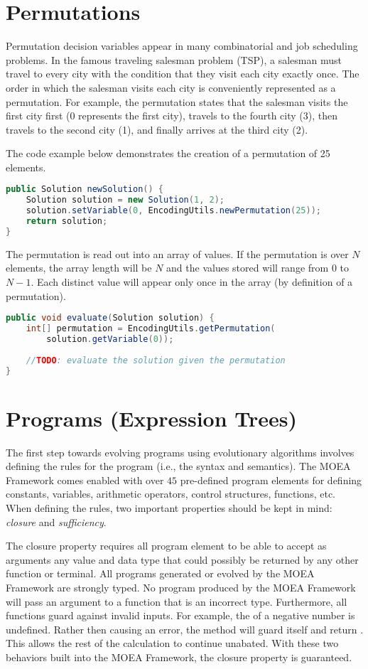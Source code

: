 \section{Permutations}
Permutation decision variables appear in many combinatorial and job scheduling problems.  In the famous traveling salesman problem (TSP), a salesman must travel to every city with the condition that they visit each city exactly once.  The order in which the salesman visits each city is conveniently represented as a permutation.  For example, the permutation  states that the salesman visits the first city first (0 represents the first city), travels to the fourth city (3), then travels to the second city (1), and finally arrives at the third city (2).

The code example below demonstrates the creation of a permutation of 25 elements.
\begin{lstlisting}[language=Java]
public Solution newSolution() {
    Solution solution = new Solution(1, 2);
    solution.setVariable(0, EncodingUtils.newPermutation(25));
    return solution;
}
\end{lstlisting}

The permutation is read out into an array of  values.  If the permutation is over $N$ elements, the array length will be $N$ and the values stored will range from $0$ to $N-1$.  Each distinct value will appear only once in the array (by definition of a permutation).
\begin{lstlisting}[language=Java]
public void evaluate(Solution solution) {
    int[] permutation = EncodingUtils.getPermutation(
        solution.getVariable(0));
        
    //TODO: evaluate the solution given the permutation
}
\end{lstlisting}

\section{Programs (Expression Trees)}
The first step towards evolving programs using evolutionary algorithms involves defining the rules for the program (i.e., the syntax and semantics).  The MOEA Framework comes enabled with over $45$ pre-defined program elements for defining constants, variables, arithmetic operators, control structures, functions, etc.  When defining the rules, two important properties should be kept in mind: \emph{closure} and \emph{sufficiency}.

The closure property requires all program element to be able to accept as arguments any value and data type that could possibly be returned by any other function or terminal.  All programs generated or evolved by the MOEA Framework are strongly typed.  No program produced by the MOEA Framework will pass an argument to a function that is an incorrect type.  Furthermore, all functions guard against invalid inputs.  For example, the  of a negative number is undefined.  Rather then causing an error, the  method will guard itself and return .  This allows the rest of the calculation to continue unabated.  With these two behaviors built into the MOEA Framework, the closure property is guaranteed.

